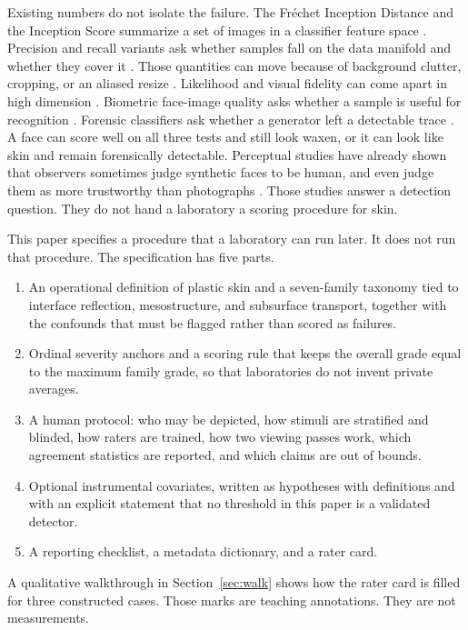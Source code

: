 \documentclass[10pt,twocolumn]{article}
\begin{document}
Existing numbers do not isolate the failure. The Fr\'echet Inception Distance and the Inception Score summarize a set of images in a classifier feature space \cite{heusel2017fid,salimans2016is}. Precision and recall variants ask whether samples fall on the data manifold and whether they cover it \cite{sajjadi2018pr,kynkaanniemi2019pr}. Those quantities can move because of background clutter, cropping, or an aliased resize \cite{parmar2022alias,borji2019}. Likelihood and visual fidelity can come apart in high dimension \cite{theis2016note}. Biometric face-image quality asks whether a sample is useful for recognition \cite{schlett2022,iso29794}. Forensic classifiers ask whether a generator left a detectable trace \cite{wang2020cnn,verdoliva2020}. A face can score well on all three tests and still look waxen, or it can look like skin and remain forensically detectable. Perceptual studies have already shown that observers sometimes judge synthetic faces to be human, and even judge them as more trustworthy than photographs \cite{nightingale2022,miller2023}. Those studies answer a detection question. They do not hand a laboratory a scoring procedure for skin.

This paper specifies a procedure that a laboratory can run later. It does not run that procedure. The specification has five parts.
\begin{enumerate}
  \item An operational definition of plastic skin and a seven-family taxonomy tied to interface reflection, mesostructure, and subsurface transport, together with the confounds that must be flagged rather than scored as failures.
  \item Ordinal severity anchors and a scoring rule that keeps the overall grade equal to the maximum family grade, so that laboratories do not invent private averages.
  \item A human protocol: who may be depicted, how stimuli are stratified and blinded, how raters are trained, how two viewing passes work, which agreement statistics are reported, and which claims are out of bounds.
  \item Optional instrumental covariates, written as hypotheses with definitions and with an explicit statement that no threshold in this paper is a validated detector.
  \item A reporting checklist, a metadata dictionary, and a rater card.
\end{enumerate}
A qualitative walkthrough in Section~\ref{sec:walk} shows how the rater card is filled for three constructed cases. Those marks are teaching annotations. They are not measurements.
\end{document}
